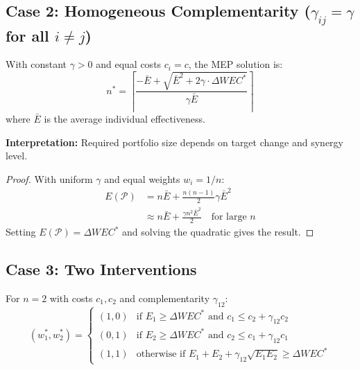 \subsection{Case 2: Homogeneous Complementarity ($\gamma_{ij} = \gamma$ for all $i \neq j$)}

\begin{proposition}
\label{prop:uniform}
With constant $\gamma > 0$ and equal costs $c_i = c$, the MEP solution is:
\begin{equation}
n^* = \left\lceil \frac{-\bar{E} + \sqrt{\bar{E}^2 + 2\gamma \cdot \Delta WEC^*}}{\gamma \bar{E}} \right\rceil
\end{equation}
where $\bar{E}$ is the average individual effectiveness.

\textbf{Interpretation:} Required portfolio size depends on target change and synergy level.
\end{proposition}

\begin{proof}
With uniform $\gamma$ and equal weights $w_i = 1/n$:
\begin{align}
E(\mathcal{P}) &= n \bar{E} + \frac{n(n-1)}{2} \gamma \bar{E}^2 \\
&\approx n \bar{E} + \frac{\gamma n^2 \bar{E}^2}{2} \quad \text{for large } n
\end{align}
Setting $E(\mathcal{P}) = \Delta WEC^*$ and solving the quadratic gives the result.
\end{proof}

\subsection{Case 3: Two Interventions}

\begin{proposition}
\label{prop:two}
For $n = 2$ with costs $c_1, c_2$ and complementarity $\gamma_{12}$:
\begin{equation}
(w_1^*, w_2^*) = \begin{cases}
(1, 0) & \text{if } E_1 \geq \Delta WEC^* \text{ and } c_1 \leq c_2 + \gamma_{12} c_2 \\
(0, 1) & \text{if } E_2 \geq \Delta WEC^* \text{ and } c_2 \leq c_1 + \gamma_{12} c_1 \\
(1, 1) & \text{otherwise if } E_1 + E_2 + \gamma_{12}\sqrt{E_1 E_2} \geq \Delta WEC^*
\end{cases}
\end{equation}
\end{proposition}


